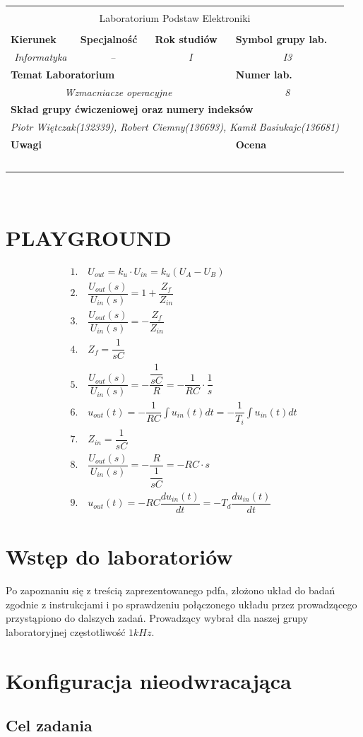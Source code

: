 \documentclass[polish,polish,a4paper]{article}
\newcommand{\PRzFieldDsc}[1]{\sffamily\bfseries\scriptsize #1}
\newcommand{\PRzFieldCnt}[1]{\textit{#1}}
\newcommand{\PRzHeading}[8]{
	
	\begin{center}
		\begin{tabular}{ p{0.32\textwidth} p{0.15\textwidth} p{0.15\textwidth} p{0.12\textwidth} p{0.12\textwidth} }
			
			&   &   &   &   \\
			\hline
			\multicolumn{5}{|c|}{}\\[-1ex]
			\multicolumn{5}{|c|}{{\LARGE #1}}\\
			\multicolumn{5}{|c|}{}\\[-1ex]
			
			\hline
			\multicolumn{1}{|l|}{\PRzFieldDsc{Kierunek}}	& \multicolumn{1}{|l|}{\PRzFieldDsc{Specjalność}}	& \multicolumn{1}{|l|}{\PRzFieldDsc{Rok studiów}}	& \multicolumn{2}{|l|}{\PRzFieldDsc{Symbol grupy lab.}} \\
			\multicolumn{1}{|c|}{\PRzFieldCnt{#2}}		& \multicolumn{1}{|c|}{\PRzFieldCnt{#3}}		& \multicolumn{1}{|c|}{\PRzFieldCnt{#4}}		& \multicolumn{2}{|c|}{\PRzFieldCnt{#5}} \\
			
			\hline
			\multicolumn{4}{|l|}{\PRzFieldDsc{Temat Laboratorium}}		& \multicolumn{1}{|l|}{\PRzFieldDsc{Numer lab.}} \\
			\multicolumn{4}{|c|}{\PRzFieldCnt{#6}}				& \multicolumn{1}{|c|}{\PRzFieldCnt{#7}} \\
			
			\hline
			\multicolumn{5}{|l|}{\PRzFieldDsc{Skład grupy ćwiczeniowej oraz numery indeksów}}\\
			\multicolumn{5}{|c|}{\PRzFieldCnt{#8}}\\
			
			\hline
			\multicolumn{3}{|l|}{\PRzFieldDsc{Uwagi}}	& \multicolumn{2}{|l|}{\PRzFieldDsc{Ocena}} \\
			\multicolumn{3}{|c|}{\PRzFieldCnt{\ }}		& \multicolumn{2}{|c|}{\PRzFieldCnt{\ }} \\
			
			\hline
		\end{tabular}
	\end{center}
}
\begin{document}
\begin{spacing}{1.3}


	\PRzHeading{Laboratorium Podstaw Elektroniki}{Informatyka}{--}{I}{I3}{Wzmacniacze operacyjne}{8}{Piotr Więtczak(132339), Robert Ciemny(136693), Kamil Basiukajc(136681)}

\

\section{PLAYGROUND}

\begin{gather*}
%
1. \quad U_{out} = k_{u} \cdot U_{in} = k_{u}(U_{A} - U_{B})\\
%
2. \quad \dfrac{U_{out}(s)}{U_{in}(s)} = 1 + \dfrac{Z_{f}}{Z_{in}}\\
%
3. \quad \dfrac{U_{out}(s)}{U_{in}(s)} = - \dfrac{Z_{f}}{Z_{in}}\\
%
4. \quad Z_{f} = \dfrac{1}{sC}\\
%
5. \quad \dfrac{U_{out}(s)}{U_{in}(s)} = - \dfrac{\dfrac{1}{sC}}{R} = - \dfrac{1}{RC} \cdot \dfrac{1}{s}\\
%
6. \quad u_{out}(t) = - \dfrac{1}{RC} \int u_{in}(t)dt = - \dfrac{1}{T_{i}} \int u_{in}(t)dt\\
%
7. \quad Z_{in} = \dfrac{1}{sC}\\
%
8. \quad \dfrac{U_{out}(s)}{U_{in}(s)} = - \dfrac{R}{\dfrac{1}{sC}} = - RC \cdot s\\
%
9. \quad u_{out}(t) = -RC\dfrac{du_{in}(t)}{dt} = -T_{d}\dfrac{du_{in}(t)}{dt}
\end{gather*}

\section{Wstęp do laboratoriów}

Po zapoznaniu się z treścią zaprezentowanego pdfa, złożono układ do badań zgodnie z instrukcjami i po sprawdzeniu połączonego układu przez prowadzącego przystąpiono do dalszych zadań. Prowadzący wybrał dla naszej grupy laboratoryjnej częstotliwość $1kHz$.

\section{Konfiguracja nieodwracająca} %

\subsection{Cel zadania}


\end{spacing}
\end{document}
